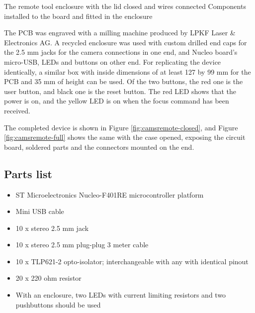 {The remote tool enclosure with the lid closed and wires connected}
{Components installed to the board and fitted in the enclosure}

The PCB was engraved with a milling machine produced by LPKF Laser \& Electronics AG.
A recycled enclosure was used with custom drilled end caps for the 2.5 mm jacks for the camera connections in one end, and Nucleo board's micro-USB, LEDs and buttons on other end.
For replicating the device identically, a similar box with inside dimensions of at least 127 by 99 mm for the PCB and 35 mm of height can be used.
Of the two buttons, the red one is the user button, and black one is the reset button.
The red LED shows that the power is on, and the yellow LED is on when the focus command has been received.

The completed device is shown in Figure \ref{fig:camsremote-closed}, and Figure \ref{fig:camsremote-full} shows the same with the case opened, exposing the circuit board, soldered parts and the connectors mounted on the end.



\subsection{Parts list}

\begin{itemize}
	\item ST Microelectronics Nucleo-F401RE microcontroller platform
	\item Mini USB cable
	\item 10 x stereo 2.5 mm jack
	\item 10 x stereo 2.5 mm plug-plug 3 meter cable
	\item 10 x TLP621-2 opto-isolator; interchangeable with any with identical pinout
	\item 20 x 220 ohm resistor
	\item With an enclosure, two LEDs with current limiting resistors and two pushbuttons should be used
\end{itemize}
